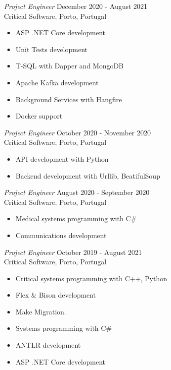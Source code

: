 \documentclass[margin, 10pt]{res} %
\begin{document}
\begin{resume}
    {\sl Project Engineer} \hfill December 2020 - August 2021\\
    Critical Software, Porto, Portugal

    \begin{itemize} \itemsep -2pt %
        \item ASP .NET Core development
        \item Unit Tests development
        \item T-SQL with Dapper and MongoDB
        \item Apache Kafka development
        \item Background Services with Hangfire
        \item Docker support
    \end{itemize}


    {\sl Project Engineer} \hfill October 2020 - November 2020\\
    Critical Software, Porto, Portugal
    \begin{itemize} \itemsep -2pt %
        \item API development with Python
        \item Backend development with Urllib, BeatifulSoup
    \end{itemize}


    {\sl Project Engineer} \hfill August 2020 - September 2020\\
    Critical Software, Porto, Portugal
    \begin{itemize} \itemsep -2pt %
        \item Medical systems programming with C\#
        \item Communications development
    \end{itemize}


    {\sl Project Engineer} \hfill October 2019 - August 2021\\
    Critical Software, Porto, Portugal

    \begin{itemize} \itemsep -2pt %
        \item Critical systems programming with C++, Python
        \item Flex \& Bison development
        \item Make Migration.
        \item Systems programming with C\#
        \item ANTLR development
        \item ASP .NET Core development
    \end{itemize}


\end{resume}
\end{document}
